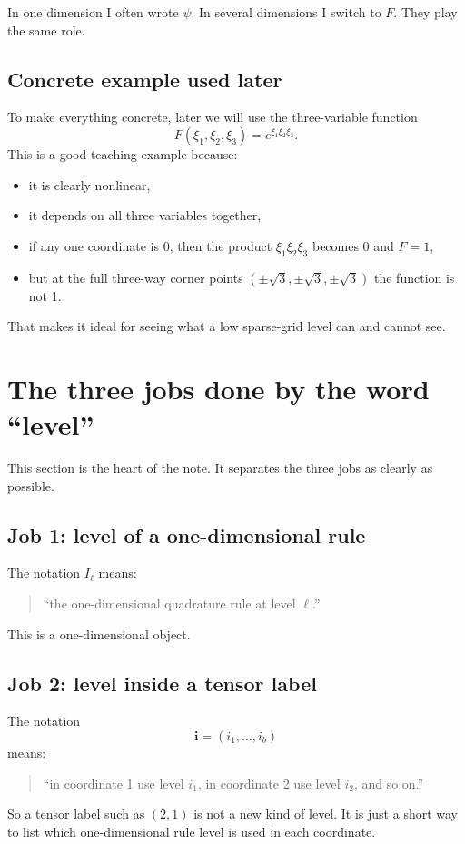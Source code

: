 \documentclass[11pt]{article}
\begin{document}
In one dimension I often wrote \(\psi\).  In several dimensions I switch to
\(F\).  They play the same role.

\subsection{Concrete example used later}

To make everything concrete, later we will use the three-variable function
\begin{equation}
  F(\xi_1,\xi_2,\xi_3)=e^{\xi_1\xi_2\xi_3}.
  \label{eq:main-example-function}
\end{equation}
This is a good teaching example because:
\begin{itemize}[leftmargin=0.28in]
  \item it is clearly nonlinear,
  \item it depends on all three variables together,
  \item if any one coordinate is 0, then the product \(\xi_1\xi_2\xi_3\) becomes
  0 and \(F=1\),
  \item but at the full three-way corner points \((\pm\sqrt3,\pm\sqrt3,\pm\sqrt3)\)
  the function is not 1.
\end{itemize}
That makes it ideal for seeing what a low sparse-grid level can and cannot see.

\section{The three jobs done by the word ``level''}
\label{sec:three-jobs}

This section is the heart of the note.  It separates the three jobs as clearly
as possible.

\subsection{Job 1: level of a one-dimensional rule}

The notation \(I_\ell\) means:
\begin{quote}
``the one-dimensional quadrature rule at level \(\ell\).''
\end{quote}
This is a one-dimensional object.

\subsection{Job 2: level inside a tensor label}

The notation
\[
  \mathbf i=(i_1,\ldots,i_b)
\]
means:
\begin{quote}
``in coordinate 1 use level \(i_1\), in coordinate 2 use level \(i_2\), and so
on.''
\end{quote}
So a tensor label such as \((2,1)\) is not a new kind of level.  It is just a
short way to list which one-dimensional rule level is used in each coordinate.
\end{document}
